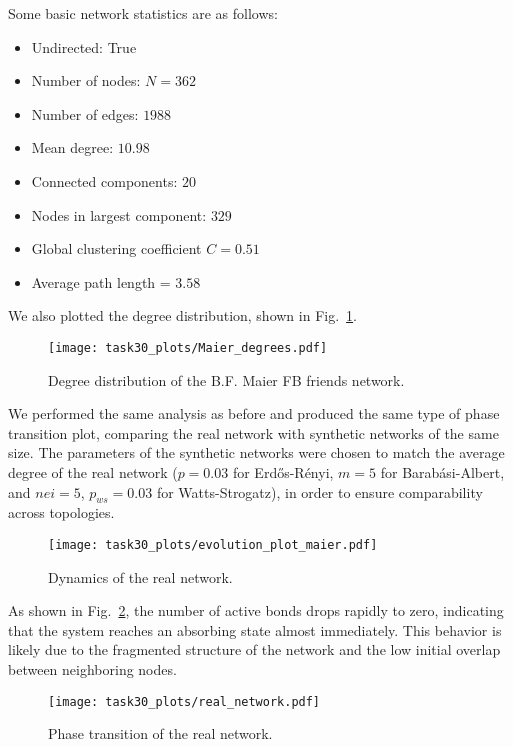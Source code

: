 Some basic network statistics are as follows:
\begin{itemize}
    \item Undirected: True
    \item Number of nodes: $N = 362$
    \item Number of edges: $1988$
    \item Mean degree: $10.98$
    \item Connected components: $20$
    \item Nodes in largest component: $329$
    \item Global clustering coefficient $C = 0.51$
    \item Average path length = $3.58$
\end{itemize}

We also plotted the degree distribution, shown in Fig.~\ref{fig:Maier_degree_distribution}.

\begin{figure}[hbtp]
    \centering
    \texttt{[image: task30\_plots/Maier\_degrees.pdf]}
    \caption{Degree distribution of the B.F. Maier FB friends network.}
    \label{fig:Maier_degree_distribution}
\end{figure}

We performed the same analysis as before and produced the same type of phase transition plot, comparing the real network with synthetic networks of the same size. The parameters of the synthetic networks were chosen to match the average degree of the real network ($p = 0.03$ for Erdős-Rényi, $m = 5$ for Barabási-Albert, and $nei = 5$, $p_{ws} = 0.03$ for Watts-Strogatz), in order to ensure comparability across topologies.

\begin{figure}[hbtp]
    \centering
    \texttt{[image: task30\_plots/evolution\_plot\_maier.pdf]}
    \caption{Dynamics of the real network.}
    \label{fig:Maier_dynamics}
\end{figure}

As shown in Fig.~\ref{fig:Maier_dynamics}, the number of active bonds drops rapidly to zero, indicating that the system reaches an absorbing state almost immediately. This behavior is likely due to the fragmented structure of the network and the low initial overlap between neighboring nodes.

\begin{figure}[hbtp]
    \centering
    \texttt{[image: task30\_plots/real\_network.pdf]}
    \caption{Phase transition of the real network.}
    \label{fig:transition_real}
\end{figure}

